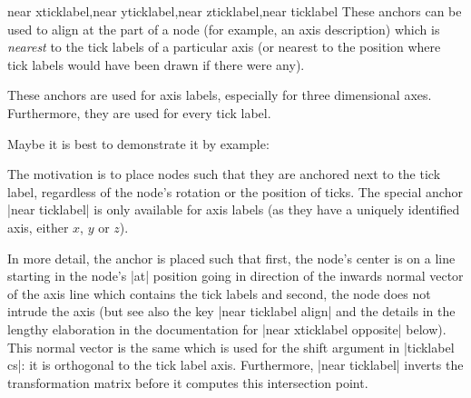 \begin{anchorlist}{near xticklabel,near yticklabel,near zticklabel,near ticklabel}
    These anchors can be used to align at the part of a node (for example, an
    axis description) which is \emph{nearest} to the tick labels of a
    particular axis (or nearest to the position where tick labels would have
    been drawn if there were any).

    These anchors are used for axis labels, especially for three dimensional
    axes. Furthermore, they are used for every tick label.

        \label{key:near:ticklabel}
    Maybe it is best to demonstrate it by example:
\begin{codeexample}[]
\end{codeexample}

    The motivation is to place nodes such that they are anchored next to the
    tick label, regardless of the node's rotation or the position of ticks. The
    special anchor |near ticklabel| is only available for axis labels (as they
    have a uniquely identified axis, either $x$, $y$ or $z$).

    In more detail, the anchor is placed such that first, the node's center is
    on a line starting in the node's |at| position going in direction of the
    inwards normal vector of the axis line which contains the tick labels and
    second, the node does not intrude the axis (but see also the key
    |near ticklabel align| and the details in the lengthy elaboration in the
    documentation for |near xticklabel opposite| below). This normal vector is
    the same which is used for the shift argument in |ticklabel cs|: it is
    orthogonal to the tick label axis. Furthermore, |near ticklabel| inverts
    the transformation matrix before it computes this intersection point.


\end{anchorlist}
